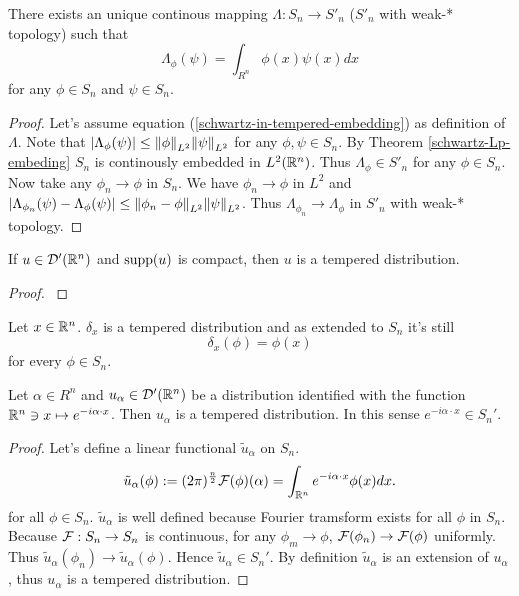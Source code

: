 \documentclass[main.tex]{subfiles}
\begin{document}
\begin{theorem}
\label{theorem-schwartz-in-tempered-embedding}
There exists an unique continous mapping $\Lambda:S_n\to S'_n$ ($S'_n$ with weak-* topology) such that
\begin{equation}
\label{schwartz-in-tempered-embedding}
\Lambda_\phi(\psi) = \int_{R^n} \phi(x)\psi(x) dx
\end{equation}
for any $\phi\in S_n$ and $\psi\in S_n$. 
\end{theorem}
\begin{proof}
Let's assume equation (\ref{schwartz-in-tempered-embedding}) as definition of $\Lambda$.
Note that $|\Lambda_\phi(\psi)| \leq \norm{\phi}_{L^2} \norm{\psi}_{L^2}$ for any $\phi,\psi\in S_n$. By Theorem \ref{schwartz-Lp-embeding} $S_n$ is continously embedded in $L^2(\mathbb{R}^n)$. Thus $\Lambda_\phi\in S'_n$ for any $\phi\in S_n$. Now take any $\phi_n\to \phi$ in $S_n$. We have $\phi_n\to \phi$ in $L^2$ and $|\Lambda_{\phi_n}(\psi) - \Lambda_\phi(\psi)| \leq \norm{\phi_n - \phi}_{L^2} \norm{\psi}_{L^2}$. Thus $\Lambda_{\phi_n} \to \Lambda_\phi$ in $S'_n$ with weak-* topology.
\end{proof}
\begin{theorem}
If $u\in \mathcal{D}'(\mathbb{R}^n)$ and $\text{supp}(u)$ is compact, then $u$ is a tempered distribution. 
\end{theorem}
\begin{proof}
\cite[see][7.12]{rudin1991}
\end{proof}
\begin{corollary} Let $x\in \mathbb{R}^n$.
$\delta_x$ is a tempered distribution and as extended to $S_n$ it's still
\begin{equation}
\delta_x(\phi) = \phi(x)
\end{equation}
for every $\phi\in S_n$.
\end{corollary}
\begin{example}
\label{exponent-tempered}
Let $\alpha\in R^n$ and $u_\alpha\in \mathcal{D}'(\mathbb{R}^n)$ be a distribution identified with the function $\mathbb{R}^n \ni x \mapsto e^{-i\alpha\cdot x}$. Then $u_\alpha$ is a tempered distribution. In this sense $e^{-i\alpha\cdot x}\in S_n'$.
\end{example}
\begin{proof}
Let's define a linear functional $\tilde{u}_\alpha$ on $S_n$.
\begin{equation}
\tilde{u}_\alpha(\phi):=(2\pi)^\frac{n}{2} \mathcal{F}(\phi)(\alpha) = \int_{\mathbb{R}^n} e^{-i\alpha\cdot x} \phi(x) dx.
\end{equation}
for all $\phi\in S_n$.
$\tilde{u}_\alpha$ is well defined because Fourier tramsform exists for all $\phi$ in $S_n$. Because $\mathcal{F}:S_n \to S_n$ is continuous, for any $\phi_m \to \phi$, $\mathcal{F}(\phi_n)\to \mathcal{F}(\phi)$ uniformly. Thus $\tilde{u}_\alpha(\phi_n) \to \tilde{u}_\alpha(\phi)$. Hence $\tilde{u}_\alpha\in S_n'$. By definition $\tilde{u}_\alpha$ is an extension of $u_\alpha$, thus $u_\alpha$ is a tempered distribution. 
\end{proof}
\end{document}

